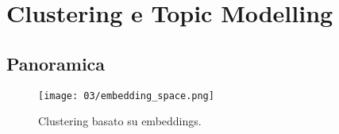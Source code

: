 \chapter{Clustering e Topic Modelling}

\section{Panoramica}

\begin{figure}[h]
    \centering
    \texttt{[image: 03/embedding\_space.png]}
    \caption{Clustering basato su embeddings.}
\end{figure}


